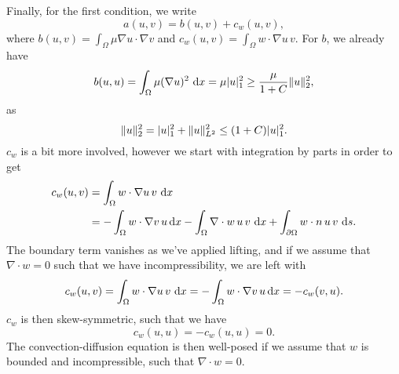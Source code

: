 Finally, for the first condition, we write
\begin{equation}
    a(u, v) = b(u, v) + c_w(u, v),
\end{equation}
where $b(u, v) = \int_{\Omega} \mu \nabla u \cdot \nabla v$ and $c_w(u, v) = \int_{\Omega} w \cdot \nabla u \, v$.
For $b$, we already have
\begin{equation}
    b(u, u) = \int_{\Omega} \mu (\nabla u)^2 \, \mathop{}\!\mathrm{d} x = \mu \lvert u\rvert_1^2 \geq \frac{\mu}{1 + C} \lVert u\rVert^2_2,
\end{equation}
as
\begin{equation}
    \lVert u\rVert^2_2 = \lvert u\rvert_1^2 + \lVert u\rVert_{L^2}^2 \leq (1 + C) \lvert u\rvert_1^2.
\end{equation}
$c_w$ is a bit more involved, however we start with integration by parts in order to get
\begin{align*}
    c_w(u, v)
    &= \int_{\Omega} w \cdot \nabla u \, v \, \mathop{}\!\mathrm{d} x \\
    &= -\int_{\Omega} w \cdot \nabla v \, u \mathop{}\!\mathrm{d} x - \int_\Omega \nabla \cdot w \, u \, v \, \mathop{}\!\mathrm{d} x + \int_{\partial\Omega} w \cdot n \, u \, v \, \mathop{}\!\mathrm{d} s.
\end{align*}
The boundary term vanishes as we've applied lifting, and if we assume that $\nabla \cdot w = 0$ such that we have incompressibility, we are left with
\begin{equation}
    c_w(u, v) = \int_{\Omega} w \cdot \nabla u \, v \, \mathop{}\!\mathrm{d} x = -\int_{\Omega} w \cdot \nabla v \, u \mathop{}\!\mathrm{d} x = -c_w(v, u).
\end{equation}
$c_w$ is then skew-symmetric, such that we have
\begin{equation}
    c_w(u, u) = -c_w(u, u) = 0.
\end{equation}
The convection-diffusion equation is then well-posed if we assume that $w$ is bounded and incompressible, such that $\nabla \cdot w = 0$.

